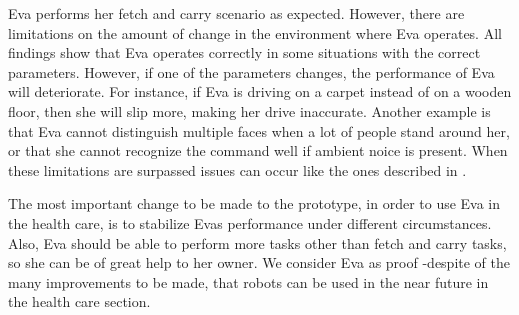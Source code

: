 \documentclass[project_eva.tex]{subfiles}
\begin{document}
Eva performs her fetch and carry scenario as expected. However, there are limitations on the amount of change in the environment where Eva operates. All findings show that Eva operates correctly in some situations with the correct parameters. However, if one of the parameters changes, the performance of Eva will deteriorate. For instance, if Eva is driving on a carpet instead of on a wooden floor, then she will slip more, making her drive inaccurate. Another example is that Eva cannot distinguish multiple faces when a lot of people stand around her, or that she cannot recognize the command well if ambient noice is present. When these limitations are surpassed issues can occur like the ones described in \pageref{simulation} . 

The most important change to be made to the prototype, in order to use Eva in the health care, is to stabilize Eva\textquotesingle s performance under different circumstances. Also, Eva should be able to perform more tasks other than fetch and carry tasks, so she can be of great help to her owner. We consider Eva as proof -despite of the many improvements to be made, that robots can be used in the near future in the health care section.
\end{document}
